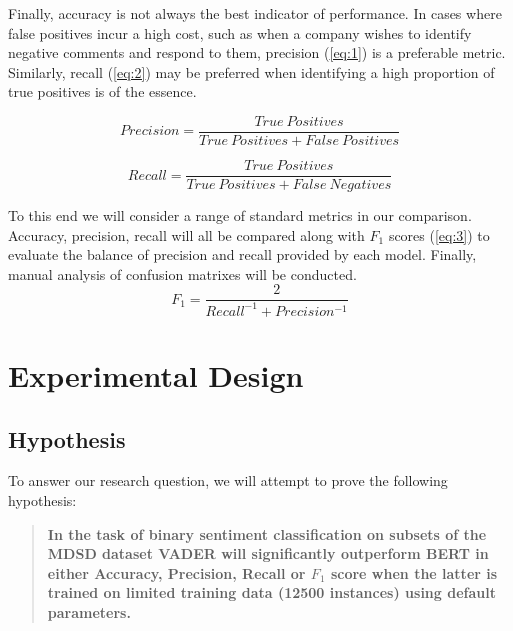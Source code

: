 \documentclass{csfourzero}
\begin{document}
Finally, accuracy is not always the best indicator of performance. In cases where false positives incur a high cost, such as when a company wishes to identify negative comments and respond to them, precision (\ref{eq:1}) is a preferable metric. Similarly, recall (\ref{eq:2}) may be preferred when identifying a high proportion of true positives is of the essence. 
\par

\begin{equation} \label{eq:1}
Precision = \frac{True\ Positives}{True\ Positives + False\ Positives}
\end{equation}

\begin{equation} \label{eq:2}
Recall = \frac{True\ Positives}{True\ Positives +  False\ Negatives}
\end{equation}

\par 
To this end we will consider a range of standard metrics in our comparison. Accuracy, precision, recall will all be compared along with $F_1$ scores (\ref{eq:3}) to evaluate the balance of precision and recall provided by each model. Finally, manual analysis of confusion matrixes will be conducted.
\begin{equation} \label{eq:3}
F_1 = \frac{2}{Recall^{-1} + Precision^{-1}}
\end{equation}

\section{Experimental Design}
\label{sec:exp}

\subsection{Hypothesis}

To answer our research question, we will attempt to prove the following hypothesis:

\begin{quote}
    \begin{center}
        \textbf{In the task of binary sentiment classification on subsets of the MDSD dataset VADER will significantly outperform BERT in either Accuracy, Precision, Recall or $F_1$ score when the latter is trained on limited training data (12500 instances) using default parameters.}
    \end{center}
\end{quote}
\end{document}
